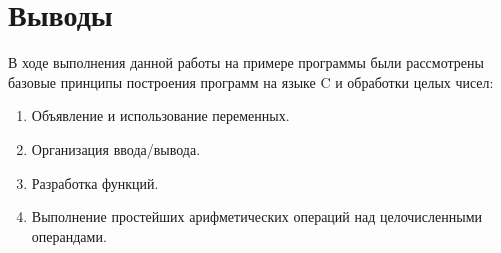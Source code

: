\section{Выводы}

В ходе выполнения данной работы на примере программы были 
рассмотрены базовые принципы построения программ 
на языке C и обработки целых чисел:

\begin{enumerate}
  \item Объявление и использование переменных.
  \item Организация ввода/вывода.
  \item Разработка функций.
  \item Выполнение простейших арифметических операций над
    целочисленными операндами.
\end{enumerate}

